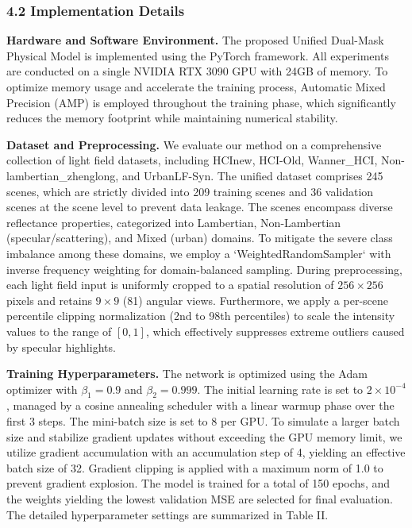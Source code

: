 \documentclass[journal]{IEEEtran}
\begin{document}
\subsubsection{4.2 Implementation Details}

\textbf{Hardware and Software Environment.} 
The proposed Unified Dual-Mask Physical Model is implemented using the PyTorch framework. All experiments are conducted on a single NVIDIA RTX 3090 GPU with 24GB of memory. To optimize memory usage and accelerate the training process, Automatic Mixed Precision (AMP) is employed throughout the training phase, which significantly reduces the memory footprint while maintaining numerical stability.

\textbf{Dataset and Preprocessing.} 
We evaluate our method on a comprehensive collection of light field datasets, including HCInew, HCI-Old, Wanner\_HCI, Non-lambertian\_zhenglong, and UrbanLF-Syn. The unified dataset comprises 245 scenes, which are strictly divided into 209 training scenes and 36 validation scenes at the scene level to prevent data leakage. The scenes encompass diverse reflectance properties, categorized into Lambertian, Non-Lambertian (specular/scattering), and Mixed (urban) domains. To mitigate the severe class imbalance among these domains, we employ a `WeightedRandomSampler` with inverse frequency weighting for domain-balanced sampling. During preprocessing, each light field input is uniformly cropped to a spatial resolution of \(256 \times 256\) pixels and retains \(9 \times 9\) (81) angular views. Furthermore, we apply a per-scene percentile clipping normalization (2nd to 98th percentiles) to scale the intensity values to the range of \([0, 1]\), which effectively suppresses extreme outliers caused by specular highlights.

\textbf{Training Hyperparameters.} 
The network is optimized using the Adam optimizer with \(\beta_1 = 0.9\) and \(\beta_2 = 0.999\). The initial learning rate is set to \(2 \times 10^{-4}\), managed by a cosine annealing scheduler with a linear warmup phase over the first 3 steps. The mini-batch size is set to 8 per GPU. To simulate a larger batch size and stabilize gradient updates without exceeding the GPU memory limit, we utilize gradient accumulation with an accumulation step of 4, yielding an effective batch size of 32. Gradient clipping is applied with a maximum norm of 1.0 to prevent gradient explosion. The model is trained for a total of 150 epochs, and the weights yielding the lowest validation MSE are selected for final evaluation. The detailed hyperparameter settings are summarized in Table II.
\end{document}

